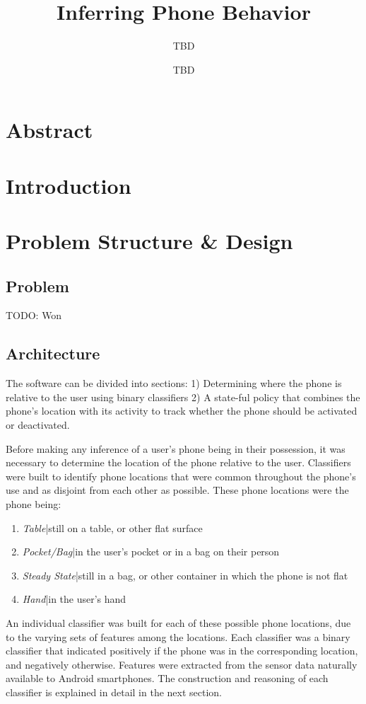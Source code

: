 \documentclass{article}
\title{Inferring Phone Behavior}
\author{TBD}
\date{TBD}
\begin{document}
\maketitle
\tableofcontents
\newpage

\section{Abstract}
\section{Introduction}

\section{Problem Structure \& Design}
\subsection{Problem}
TODO: Won
\subsection{Architecture}
The software can be divided into sections: 1) Determining where the phone is relative to the user using binary classifiers
2) A state-ful policy that combines the phone's location with its activity to track whether the phone should be activated or deactivated.

Before making any inference of a user's phone being in their possession, it was necessary to determine the location
of the phone relative to the user.
Classifiers were built to identify phone locations that were common throughout the phone's use and as disjoint from 
each other as possible. These phone locations were the phone being:
\begin{enumerate}
\item \textit{Table}|still on a table, or other flat surface
\item \textit{Pocket/Bag}|in the user's pocket or in a bag on their person
\item \textit{Steady State}|still in a bag, or other container in which the phone is not flat
\item \textit{Hand}|in the user's hand
\end{enumerate}

An individual classifier was built for each of these possible phone locations, due to the varying sets of features among
the locations. Each classifier was a binary classifier that indicated positively if the phone was in the corresponding location,
and negatively otherwise. Features were extracted from the sensor data naturally available to Android smartphones. The construction
and reasoning of each classifier is explained in detail in the next section.
\end{document}
